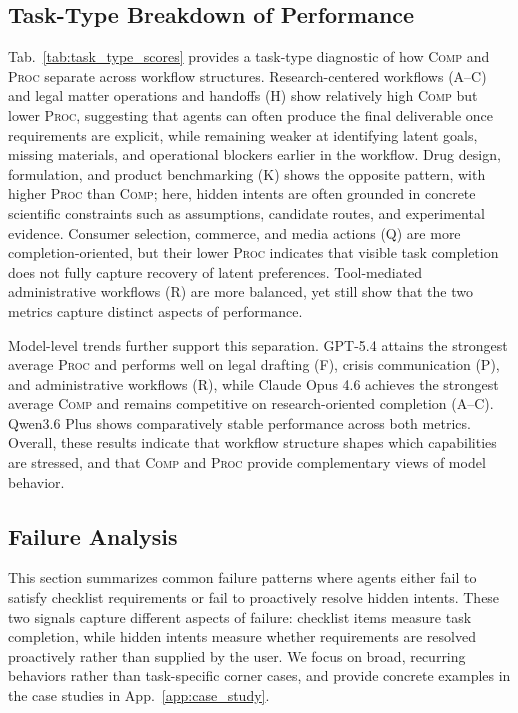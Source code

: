 \subsection{Task-Type Breakdown of Performance}
\label{app:exp_task_type}


Tab.~\ref{tab:task_type_scores} provides a task-type diagnostic of how \textsc{Comp} and \textsc{Proc} separate across workflow structures. Research-centered workflows (A--C) and legal matter operations and handoffs (H) show relatively high \textsc{Comp} but lower \textsc{Proc}, suggesting that agents can often produce the final deliverable once requirements are explicit, while remaining weaker at identifying latent goals, missing materials, and operational blockers earlier in the workflow. Drug design, formulation, and product benchmarking (K) shows the opposite pattern, with higher \textsc{Proc} than \textsc{Comp}; here, hidden intents are often grounded in concrete scientific constraints such as assumptions, candidate routes, and experimental evidence. Consumer selection, commerce, and media actions (Q) are more completion-oriented, but their lower \textsc{Proc} indicates that visible task completion does not fully capture recovery of latent preferences. Tool-mediated administrative workflows (R) are more balanced, yet still show that the two metrics capture distinct aspects of performance.

Model-level trends further support this separation. GPT-5.4 attains the strongest average \textsc{Proc} and performs well on legal drafting (F), crisis communication (P), and administrative workflows (R), while Claude Opus 4.6 achieves the strongest average \textsc{Comp} and remains competitive on research-oriented completion (A--C). Qwen3.6 Plus shows comparatively stable performance across both metrics. Overall, these results indicate that workflow structure shapes which capabilities are stressed, and that \textsc{Comp} and \textsc{Proc} provide complementary views of model behavior.

\subsection{Failure Analysis}
\label{app:failure_analysis}

This section summarizes common failure patterns where agents either fail to satisfy checklist requirements or fail to proactively resolve hidden intents. These two signals capture different aspects of failure: checklist items measure task completion, while hidden intents measure whether requirements are resolved proactively rather than supplied by the user. We focus on broad, recurring behaviors rather than task-specific corner cases, and provide concrete examples in the case studies in App.~\ref{app:case_study}.


